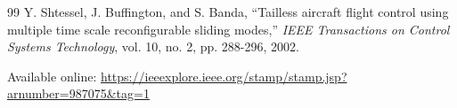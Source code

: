 \documentclass[11pt]{article}
\begin{document}
\newpage
\begin{thebibliography}{99}
 Y. Shtessel, J. Buffington, and S. Banda, ``Tailless aircraft flight control using multiple time scale reconfigurable sliding modes,'' \emph{IEEE Transactions on Control Systems Technology}, vol. 10, no. 2, pp. 288-296, 2002. 

Available online: \url{https://ieeexplore.ieee.org/stamp/stamp.jsp?arnumber=987075&tag=1}
\end{thebibliography}
\end{document}

